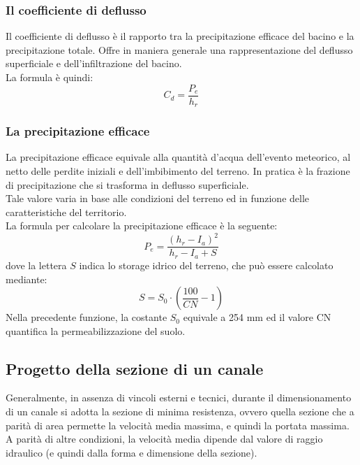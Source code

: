 \subsubsection*{Il coefficiente di deflusso}
Il coefficiente di deflusso è il rapporto tra la precipitazione efficace del bacino e la precipitazione totale. Offre in maniera generale una rappresentazione del deflusso superficiale e dell'infiltrazione del bacino.\\
La formula è quindi:
\begin{equation}
    C_d = \frac{P_e}{h_r}
    \label{Cd}
\end{equation}
\subsubsection*{La precipitazione efficace}
La precipitazione efficace equivale alla quantità d'acqua dell'evento meteorico, al netto delle perdite iniziali e dell'imbibimento del terreno. In pratica è la frazione di precipitazione che si trasforma in deflusso superficiale.\\
Tale valore varia in base alle condizioni del terreno ed in funzione delle caratteristiche del territorio.\\
La formula per calcolare la precipitazione efficace è la seguente: 
\begin{equation}
    P_e = \frac{(h_r - I_a)^2}{h_r - I_a + S}
    \label{Pe}
\end{equation}
dove la lettera $S$ indica lo storage idrico del terreno, che può essere calcolato mediante: 
\begin{equation}
    S = S_0 \cdot \left ( \frac{100}{CN} -1 \right )
    \label{storage}
\end{equation}
Nella precedente funzione, la costante $S_0$ equivale a 254 mm ed il valore CN quantifica la permeabilizzazione del suolo.

\subsection{Progetto della sezione di un canale}
Generalmente, in assenza di vincoli esterni e tecnici, durante il dimensionamento di un canale si adotta la sezione di minima resistenza, ovvero quella sezione che a parità di area permette la velocità media massima, e quindi la portata massima.\\
A parità di altre condizioni, la velocità media dipende dal valore di raggio idraulico (e quindi dalla forma e dimensione della sezione).
